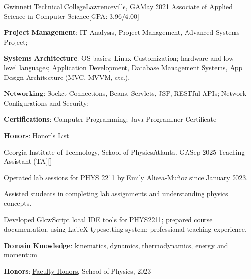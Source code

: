 \begin{resume-itemize}
  {Gwinnett Technical College}{Lawrenceville, GA}{May 2021}
  {Associate of Applied Science in Computer Science}[GPA: 3.96/4.00]
    \item \textbf{Project Management}: IT Analysis, Project Management, Advanced Systems Project; 
    \item \textbf{Systems Architecture}: 
    OS basics; Linux Customization; hardware and low-level languages;
    Application Development, Database Management Systems,
    App Design Architecture (MVC, MVVM, etc.),
    \item \textbf{Networking}: 
    Socket Connections, Beans, Servlets, JSP, RESTful APIs;
    Network Configurations and Security;
    \item \textbf{Certifications}: Computer Programming; Java Programmer Certificate
    \item \textbf{Honors}: Honor's List
\end{resume-itemize}
\begin{resume-itemize}
  {Georgia Institute of Technology, School of Physics}{Atlanta, GA}{Sep 2025}
  {Teaching Assistant (TA)}[\href{https://github.com/ExtraneousFalcon/JIE-3342-HeartFailureApp}{}]
  \item Operated lab sessions for PHYS 2211 by \href{https://physics.gatech.edu/user/emily-alicea-munoz}{Emily Alicea-Muñoz} since January 2023. 
  \item Assisted students in completing lab assignments and understanding 
  physics concepts.
  \item Developed GlowScript local IDE tools for PHYS2211; prepared course 
  documentation using LaTeX typesetting system; professional teaching experience.
  \item \textbf{Domain Knowledge}: kinematics, dynamics, thermodynamics, energy and momentum
  \item \textbf{Honors}: \href{https://gatech.meritpages.com/stories/Jaehoon-Song-Earns-Faculty-Honors-at-Georgia-Tech-for-the-Fall-2023-Semester/125669685}{Faculty Honors}, School of Physics, 2023
\end{resume-itemize}
